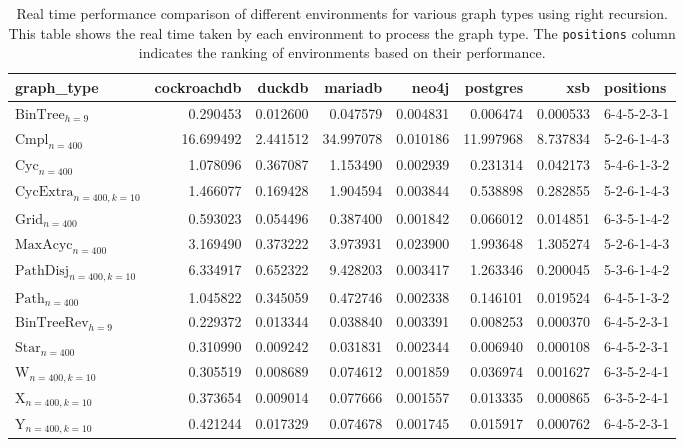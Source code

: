 \begin{table}
\caption{Real time performance comparison of different environments for various graph types using right recursion. This table shows the real time taken by each environment to process the graph type. The \texttt{positions} column indicates the ranking of environments based on their performance.}
\label{table:results}
\begin{tabular}{lrrrrrrl}
\toprule
graph\_type & cockroachdb & duckdb & mariadb & neo4j & postgres & xsb & positions \\
\midrule
$\text{BinTree}_{h=9}$ & 0.290453 & 0.012600 & 0.047579 & 0.004831 & 0.006474 & 0.000533 & 6-4-5-2-3-1 \\
$\text{Cmpl}_{n=400}$ & 16.699492 & 2.441512 & 34.997078 & 0.010186 & 11.997968 & 8.737834 & 5-2-6-1-4-3 \\
$\text{Cyc}_{n=400}$ & 1.078096 & 0.367087 & 1.153490 & 0.002939 & 0.231314 & 0.042173 & 5-4-6-1-3-2 \\
$\text{CycExtra}_{n=400,k=10}$ & 1.466077 & 0.169428 & 1.904594 & 0.003844 & 0.538898 & 0.282855 & 5-2-6-1-4-3 \\
$\text{Grid}_{n=400}$ & 0.593023 & 0.054496 & 0.387400 & 0.001842 & 0.066012 & 0.014851 & 6-3-5-1-4-2 \\
$\text{MaxAcyc}_{n=400}$ & 3.169490 & 0.373222 & 3.973931 & 0.023900 & 1.993648 & 1.305274 & 5-2-6-1-4-3 \\
$\text{PathDisj}_{n=400,k=10}$ & 6.334917 & 0.652322 & 9.428203 & 0.003417 & 1.263346 & 0.200045 & 5-3-6-1-4-2 \\
$\text{Path}_{n=400}$ & 1.045822 & 0.345059 & 0.472746 & 0.002338 & 0.146101 & 0.019524 & 6-4-5-1-3-2 \\
$\text{BinTreeRev}_{h=9}$ & 0.229372 & 0.013344 & 0.038840 & 0.003391 & 0.008253 & 0.000370 & 6-4-5-2-3-1 \\
$\text{Star}_{n=400}$ & 0.310990 & 0.009242 & 0.031831 & 0.002344 & 0.006940 & 0.000108 & 6-4-5-2-3-1 \\
$\text{W}_{n=400,k=10}$ & 0.305519 & 0.008689 & 0.074612 & 0.001859 & 0.036974 & 0.001627 & 6-3-5-2-4-1 \\
$\text{X}_{n=400, k=10}$ & 0.373654 & 0.009014 & 0.077666 & 0.001557 & 0.013335 & 0.000865 & 6-3-5-2-4-1 \\
$\text{Y}_{n=400,k=10}$ & 0.421244 & 0.017329 & 0.074678 & 0.001745 & 0.015917 & 0.000762 & 6-4-5-2-3-1 \\
\bottomrule
\end{tabular}
\end{table}
